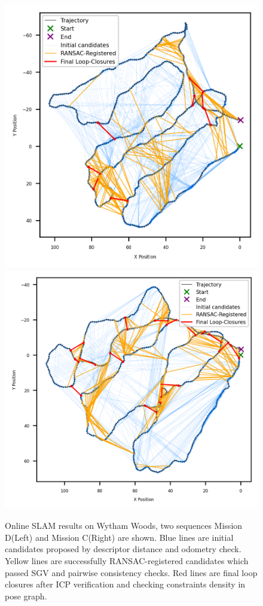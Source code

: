\begin{figure}[htbp]
  \centering
  \includegraphics[width=0.49\columnwidth]{pics/exp_2_1_wytham_D.png}
  \includegraphics[width=0.49\columnwidth]{pics/exp_2_1_wytham_C.png}
  \caption{Online SLAM results on Wytham Woods, two sequences Mission D(Left) and Mission C(Right) are shown. Blue lines are initial candidates proposed by descriptor distance and odometry check. Yellow lines are successfully RANSAC-registered candidates which passed SGV and pairwise consistency checks. Red lines are final loop closures after ICP verification and checking constraints density in pose graph.}
  \label{fig:exp_2_1_ewytham_online}
\end{figure}


